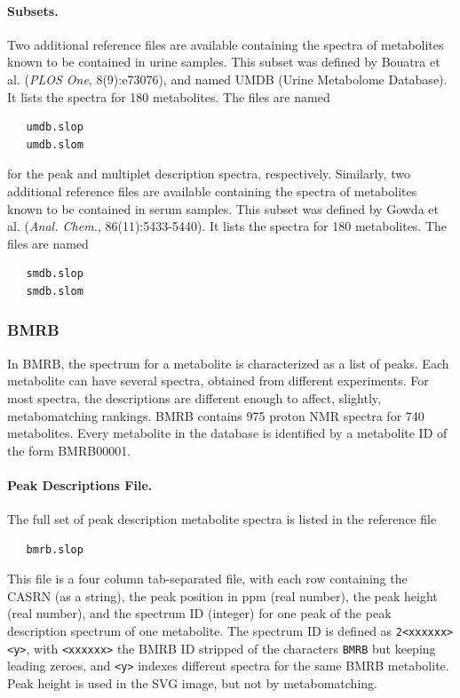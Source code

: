 \documentclass[a4paper,11pt]{article}
\begin{document}
\paragraph{Subsets.} Two additional reference files are available containing the spectra of metabolites known to be contained in urine samples. This subset was defined by Bouatra et al. (\emph{PLOS One}, 8(9):e73076), and named UMDB (Urine Metabolome Database). It lists the spectra for 180 metabolites. The files are named
\begin{verbatim}
   umdb.slop
   umdb.slom
\end{verbatim}
for the peak and multiplet description spectra, respectively. Similarly, two additional reference files are available containing the spectra of metabolites known to be contained in serum samples. This subset was defined by Gowda et al. (\emph{Anal. Chem.}, 86(11):5433-5440). It lists the spectra for 180 metabolites. The files are named
\begin{verbatim}
   smdb.slop
   smdb.slom
\end{verbatim}
\subsubsection{BMRB}
In BMRB, the spectrum for a metabolite is characterized as a list of peaks. Each metabolite can have several spectra, obtained from different experiments. For most spectra, the descriptions are different enough to affect, slightly, metabomatching rankings. BMRB contains 975 proton NMR spectra for 740 metabolites. Every metabolite in the database is identified by a metabolite ID of the form BMRB00001.
\paragraph{Peak Descriptions File.} The full set of peak description metabolite spectra is listed in the reference file
\begin{verbatim}
   bmrb.slop
\end{verbatim}
This file is a four column tab-separated file, with each row containing the CASRN (as a string), the peak position in ppm (real number), the peak height (real number), and the spectrum ID (integer) for one peak of the peak description spectrum of one metabolite. The spectrum ID is defined as \verb|2<xxxxxx><y>|, with \verb|<xxxxxx>| the BMRB ID stripped of the characters \verb|BMRB| but keeping leading zeroes, and \verb|<y>| indexes different spectra for the same BMRB metabolite. Peak height is used in the SVG image, but not by metabomatching.
\end{document}
